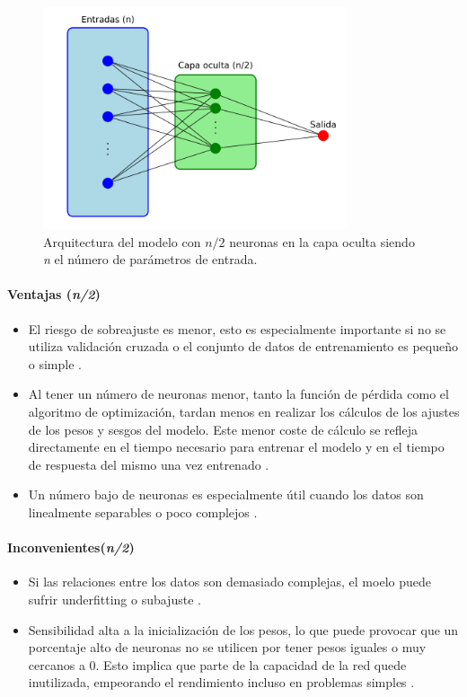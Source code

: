 \begin{figure}[H]
    \centering
    \includegraphics[width=0.8\textwidth]{./img/modelo/arqnmediosBIN.pdf}
    \caption{Arquitectura del modelo con $n/2$ neuronas en la capa oculta siendo \textit{n} el número de parámetros de entrada.}
    \label{fig:arqnmediosBIN}
\end{figure}

\paragraph{Ventajas (\textit{n/2})}
\begin{itemize}
	\item El riesgo de sobreajuste es menor, esto es especialmente importante si no se utiliza validación cruzada o el conjunto de datos de entrenamiento es pequeño o simple \cite{chollet2017deep}.
	\item  Al tener un número de neuronas menor, tanto la función  de pérdida como el algoritmo de optimización, tardan menos en realizar los cálculos de los ajustes de los pesos y sesgos del modelo. Este menor coste de cálculo se refleja directamente en el tiempo necesario para entrenar el modelo y en el tiempo de respuesta del mismo una vez entrenado \cite{goodfellow2016deep}.
	\item Un número bajo de neuronas es especialmente útil cuando los datos son linealmente separables o poco complejos \cite{ruck1996hidden}.
\end{itemize}
\paragraph{Inconvenientes(\textit{n/2})}
\begin{itemize}
	\item Si las relaciones entre los datos son demasiado complejas, el moelo puede sufrir underfitting o subajuste \cite{goodfellow2016deep}.
	\item Sensibilidad alta a la inicialización de los pesos, lo que puede provocar que un porcentaje alto de neuronas no se utilicen por tener pesos iguales o muy cercanos a 0. Esto implica que parte de la capacidad de la red quede inutilizada, empeorando el rendimiento incluso en problemas simples \cite{glorot2010understanding}.
\end{itemize}

